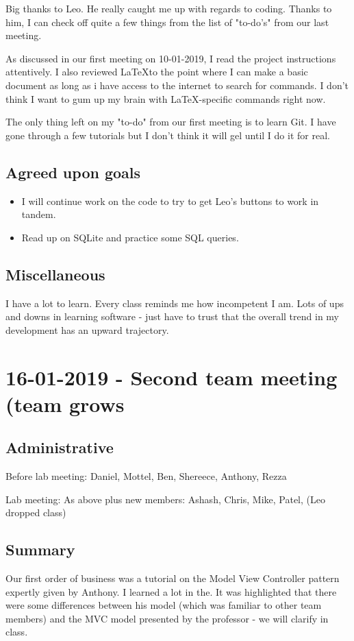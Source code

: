 \documentclass[12pt]{article}
\begin{document}
	Big thanks to Leo. He really caught me up with regards to coding. Thanks to him, I can check off quite a few things from the list of "to-do's" from our last meeting.
	
	As discussed in our first meeting on 10-01-2019, I read the project instructions attentively. I also reviewed \LaTeX to the point where I can make a basic document as long as i have access to the internet to search for commands. I don't think I want to gum up my brain with \LaTeX -specific commands right now.
	
	The only thing left on my "to-do" from our first meeting is to learn Git. I have gone through a few tutorials but I don't think it will gel until I do it for real.
	
	\subsection{Agreed upon goals}
	\begin{itemize}
		\item I will continue work on the code to try to get Leo's buttons to work in tandem.
		\item Read up on SQLite and practice some SQL queries.
	\end{itemize}
	
	\subsection{Miscellaneous}
	I have a lot to learn. Every class reminds me how incompetent I am. Lots of ups and downs in learning software - just have to trust that the overall trend in my development has an upward trajectory.
	
	\pagebreak
	
	\section{16-01-2019 - Second team meeting (team grows}
	
	\subsection{Administrative}
	Before lab meeting: Daniel, Mottel, Ben, Shereece, Anthony, Rezza
	
	Lab meeting: As above plus new members: Ashash, Chris, Mike, Patel, (Leo dropped class)
	
	\subsection{Summary}
	Our first order of business was a tutorial on the Model View Controller pattern expertly given by Anthony. I learned a lot in the. It was highlighted that there were some differences between his model (which was familiar to other team members) and the MVC model presented by the professor - we will clarify in class.
	
\end{document}
